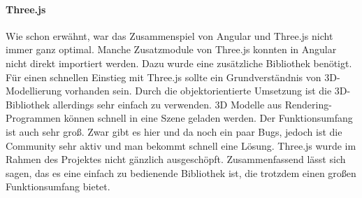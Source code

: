 \paragraph{Three.js}
Wie schon erwähnt, war das Zusammenspiel von Angular und Three.js nicht immer ganz optimal. Manche Zusatzmodule von Three.js konnten in Angular nicht direkt importiert werden. Dazu wurde eine zusätzliche Bibliothek benötigt. Für einen schnellen Einstieg mit Three.js sollte ein Grundverständnis von 3D-Modellierung vorhanden sein. Durch die objektorientierte Umsetzung ist die 3D-Bibliothek allerdings sehr einfach zu verwenden. 3D Modelle aus Rendering-Programmen können schnell in eine Szene geladen werden. Der Funktionsumfang ist auch sehr groß. Zwar gibt es hier und da noch ein paar Bugs, jedoch ist die Community sehr aktiv und man bekommt schnell eine Lösung. Three.js wurde im Rahmen des Projektes nicht gänzlich ausgeschöpft. Zusammenfassend lässt sich sagen, das es eine einfach zu bedienende Bibliothek ist, die trotzdem einen großen Funktionsumfang bietet.